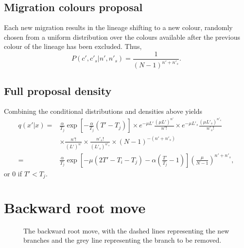\documentclass[a4paper,11pt]{article}
\begin{document}
\subsection{Migration colours proposal}

Each new migration results in the lineage shifting to a new colour,
randomly chosen from a uniform distribution over the colours available
after the previous colour of the lineage has been excluded.  Thus,
\begin{equation}
  P(c',c'_s|n',n'_s)=\frac{1}{(N-1)^{n'+n'_s}}.
\end{equation}

\subsection{Full proposal density}

Combining the conditional distributions and densities above yields
\begin{align}
  q(x'|x)=&\frac{\alpha}{T_j}\exp\left[-\frac{\alpha}{T_j}(T'-T_j)\right]
  \times e^{-\mu L'}\frac{(\mu L')^{n'}}{n'!}
  \times e^{-\mu L'_s}\frac{(\mu L'_s)^{n'_s}}{n'_s!}\nonumber\\
  &\times \frac{n'!}{(L')^{n'}}
  \times \frac{n'_s!}{(L'_s)^{n'_s}}
  \times (N-1)^{-(n'+n'_s)}\nonumber\\
=&\frac{\alpha}{T_j}\exp\left[-\mu(2T'-T_i-T_j)-\alpha\left(\frac{T'}{T_j}-1\right)\right]\left(\frac{\mu}{N-1}\right)^{n'+n'_s},
\end{align}
or $0$ if $T'<T_j$.

\section{Backward root move}

\begin{figure}
\begin{center}
\end{center}
\caption{The backward root move, with the dashed lines representing
the new branches and the grey line representing the branch to be
removed.}
\end{figure}
\end{document}
